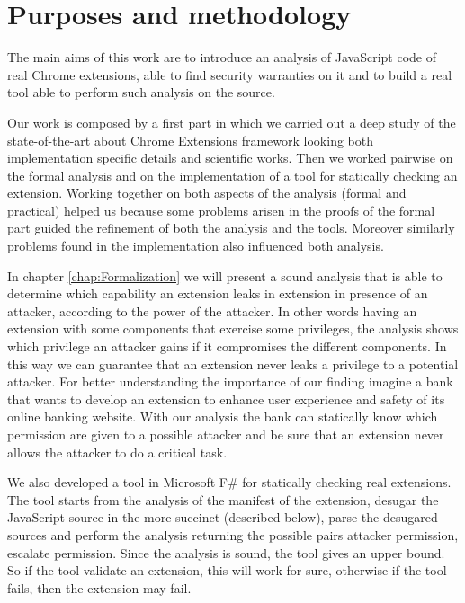 \section{Purposes and methodology} 
\label{sec:OurWork}
The main aims of this work are to introduce an analysis of JavaScript code of real Chrome extensions, able to find security warranties on it and to build a real tool able to perform such analysis on the source. 

Our work is composed by a first part in which we carried out a deep study of the state-of-the-art about Chrome Extensions framework looking both implementation specific details and scientific works. Then we worked pairwise on the formal analysis and on the implementation of a tool for statically checking an extension. Working together on both aspects of the analysis (formal and practical) helped us because some problems arisen in the proofs of the formal part guided the refinement of both the analysis and the tools. Moreover similarly problems found in the implementation also influenced both analysis.

In chapter \ref{chap:Formalization} we will present a sound analysis that is able to determine which capability an extension leaks in extension in presence of an attacker, according to the power of the attacker. In other words having an extension with some components that exercise some privileges, the analysis shows which privilege an attacker gains if it compromises the different components. In this way we can guarantee that an extension never leaks a privilege to a potential attacker. For better understanding the importance of our finding imagine a bank that wants to develop an extension to enhance user experience and safety of its online banking website. With our analysis the bank can statically know which permission are given to a possible attacker and be sure that an extension never allows the attacker to do a critical task.

We also developed a tool in Microsoft F\# for statically checking real extensions. The tool starts from the analysis of the manifest of the extension, desugar the JavaScript source in the more succinct \ljs (described below), parse the desugared sources and perform the analysis returning the possible pairs attacker permission, escalate permission. Since the analysis is sound, the tool gives an upper bound. So if the tool validate an extension, this will work for sure, otherwise if the tool fails, then the extension may fail.
